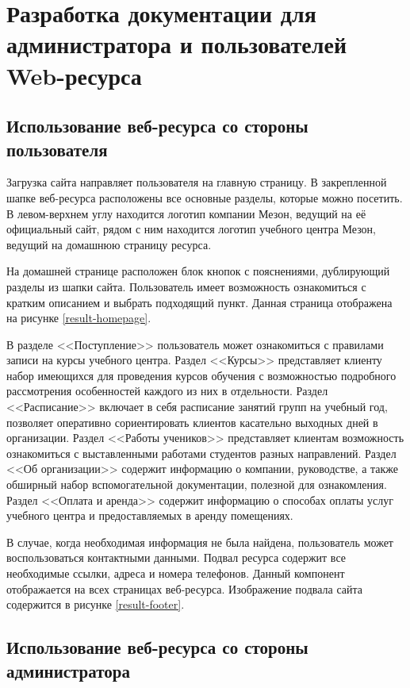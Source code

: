 \section{Разработка документации для администратора и пользователей Web-ресурса}

\subsection{Использование веб-ресурса со стороны пользователя}

Загрузка сайта направляет пользователя на главную страницу.
В закрепленной шапке веб-ресурса расположены все основные разделы, которые можно посетить.
В левом-верхнем углу находится логотип компании Мезон, ведущий на её официальный сайт, рядом с ним находится логотип учебного центра Мезон, ведущий на домашнюю страницу ресурса.

На домашней странице расположен блок кнопок с пояснениями, дублирующий разделы из шапки сайта.
Пользователь имеет возможность ознакомиться с кратким описанием и выбрать подходящий пункт.
Данная страница отображена на рисунке \ref{result-homepage}.


В разделе <<Поступление>> пользователь может ознакомиться с правилами записи на курсы учебного центра.
Раздел <<Курсы>> представляет клиенту набор имеющихся для проведения курсов обучения с возможностью подробного рассмотрения особенностей каждого из них в отдельности.
Раздел <<Расписание>> включает в себя расписание занятий групп на учебный год, позволяет оперативно сориентировать клиентов касательно выходных дней в организации.
Раздел <<Работы учеников>> представляет клиентам возможность ознакомиться с выставленными работами студентов разных направлений.
Раздел <<Об организации>> содержит информацию о компании, руководстве, а также обширный набор вспомогательной документации, полезной для ознакомления.
Раздел <<Оплата и аренда>> содержит информацию о способах оплаты услуг учебного центра и предоставляемых в аренду помещениях.

В случае, когда необходимая информация не была найдена, пользователь может воспользоваться контактными данными.
Подвал ресурса содержит все необходимые ссылки, адреса и номера телефонов.
Данный компонент отображается на всех страницах веб-ресурса.
Изображение подвала сайта содержится в рисунке \ref{result-footer}.


\subsection{Использование веб-ресурса со стороны администратора}

\clearpage
